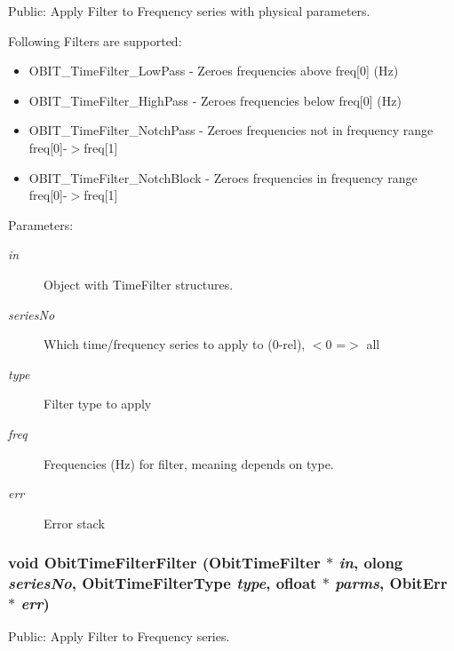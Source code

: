 Public: Apply Filter to Frequency series with physical parameters. 

Following Filters are supported: \begin{itemize}
\item OBIT\_\-Time\-Filter\_\-Low\-Pass - Zeroes frequencies above freq[0] (Hz) \item OBIT\_\-Time\-Filter\_\-High\-Pass - Zeroes frequencies below freq[0] (Hz) \item OBIT\_\-Time\-Filter\_\-Notch\-Pass - Zeroes frequencies not in frequency range freq[0]-$>$freq[1] \item OBIT\_\-Time\-Filter\_\-Notch\-Block - Zeroes frequencies in frequency range freq[0]-$>$freq[1]\end{itemize}
\begin{Desc}
\item[Parameters:]
\begin{description}
\item[{\em in}]Object with Time\-Filter structures. \item[{\em series\-No}]Which time/frequency series to apply to (0-rel), $<$0 =$>$ all \item[{\em type}]Filter type to apply \item[{\em freq}]Frequencies (Hz) for filter, meaning depends on type. \item[{\em err}]Error stack \end{description}
\end{Desc}
\subsubsection{\setlength{\rightskip}{0pt plus 5cm}void Obit\-Time\-Filter\-Filter ({\bf Obit\-Time\-Filter} $\ast$ {\em in}, {\bf olong} {\em series\-No}, Obit\-Time\-Filter\-Type {\em type}, {\bf ofloat} $\ast$ {\em parms}, {\bf Obit\-Err} $\ast$ {\em err})}\label{ObitTimeFilter_8c_a14}


Public: Apply Filter to Frequency series. 

